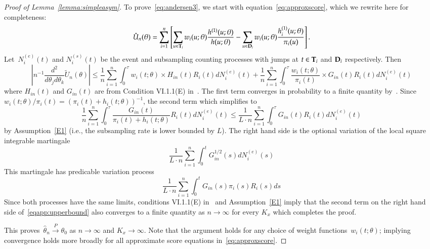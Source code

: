 \documentclass[11pt]{amsart}
\def\bfT{{\bf T}}
\def\bfD{{\bf D}}
\begin{document}
\begin{proof}[Proof of Lemma~\ref{lemma:simpleasym}]
To prove~\eqref{eq:andersen3}, we start with equation~\eqref{eq:approxscore}, which we rewrite here for completeness:
\[
\hat{U}_n (\theta) = \sum_{i=1}^n \left[ \sum_{u \in \bfT_i} w_i(u; \theta)
  \frac{h^{(1)} (u; \theta)}{ h ( u; \theta)}  - \sum_{u \in \bfD_i} w_i(u;
  \theta) \frac{h_i^{(1)} (u; \theta)}{ \pi_i (u) } \right].
\]
Let~$N_i^{(e)} (t)$ and $N_i^{(s)} (t)$ be the event and subsampling counting processes with jumps at $t \in \bfT_i$ and $\bfD_i$ respectively.  Then
\begin{equation}
\label{eqapp:upperbound}
\left | n^{-1} \frac{d^2}{d \theta_j d \theta_k} \tilde U_n (\theta)  \right | \leq \frac{1}{n} \sum_{i=1}^n \int_0^\tau w_i (t;\theta) \times H_{in} (t) R_i (t) dN_i^{(e)} (t) +
\frac{1}{n} \sum_{i=1}^n \int_0^\tau \frac{w_i (t;\theta)}{\pi_i (t)} \times G_{in} (t) R_i (t) dN_i^{(e)} (t)
\end{equation}
where $H_{in}(t)$ and $G_{in}(t)$ are from Condition VI.1.1(E) in~\cite[pp. 421]{Andersen1993}. The first term converges in probability to a finite quantity by~\cite{Andersen1993}.  Since~$w_i(t;\theta)/\pi_i (t) = (\pi_i(t)+h_i(t;\theta))^{-1}$, the second term which simplifies to
\[
\frac{1}{n} \sum_{i=1}^n \int_0^\tau \frac{G_{in} (t)}{\pi_i (t)+h_i(t;\theta)} R_i(t) dN_i^{(e)} (t)
\leq
\frac{1}{L \cdot n} \sum_{i=1}^n \int_0^\tau G_{in} (t) R_i (t) dN_i^{(e)} (t)
\]
by Assumption~\ref{E1} (i.e., the subsampling rate is lower bounded by $L$). The right hand side is the optional variation of the local square integrable martingale
$$
\frac{1}{L \cdot n} \sum_{i=1}^n \int_0^t G^{1/2}_{in} (s) dN_i^{(e)} (s)
$$
This martingale has predicable variation process
$$
\frac{1}{L \cdot n} \sum_{i=1}^n \int_0^t G_{in} (s) \pi_i (s) R_i (s) ds
$$
Since both processes have the same limits, conditions VI.1.1(E) in~\cite{Andersen1993} and Assumption~\ref{E1} imply that the second term on the right hand side of~\eqref{eqapp:upperbound} also converges to a finite quantity as $n \to \infty$ for every $K_x$ which completes the proof.

This proves~$\hat \theta_n \overset{P}{\to} \theta_0$ as $n \to \infty$ and $K_x \to \infty$. Note that the argument holds for any choice of weight functions~$w_i (t;\theta)$; implying convergence holds more broadly for all approximate score equations in~\eqref{eq:approxscore}.
\end{proof}
\end{document}
